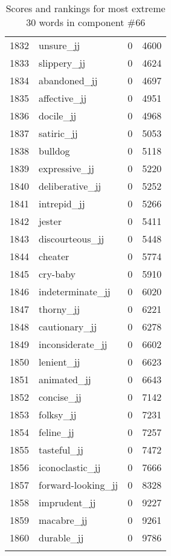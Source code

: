 \begin{longtable}[!htbp]{| rlr@{.}l |}
    1832 & unsure\_jj & 0 & 4600 \\
    1833 & slippery\_jj & 0 & 4624 \\
    1834 & abandoned\_jj & 0 & 4697 \\
    1835 & affective\_jj & 0 & 4951 \\
    1836 & docile\_jj & 0 & 4968 \\
    1837 & satiric\_jj & 0 & 5053 \\
    1838 & bulldog & 0 & 5118 \\
    1839 & expressive\_jj & 0 & 5220 \\
    1840 & deliberative\_jj & 0 & 5252 \\
    1841 & intrepid\_jj & 0 & 5266 \\
    1842 & jester & 0 & 5411 \\
    1843 & discourteous\_jj & 0 & 5448 \\
    1844 & cheater & 0 & 5774 \\
    1845 & cry-baby & 0 & 5910 \\
    1846 & indeterminate\_jj & 0 & 6020 \\
    1847 & thorny\_jj & 0 & 6221 \\
    1848 & cautionary\_jj & 0 & 6278 \\
    1849 & inconsiderate\_jj & 0 & 6602 \\
    1850 & lenient\_jj & 0 & 6623 \\
    1851 & animated\_jj & 0 & 6643 \\
    1852 & concise\_jj & 0 & 7142 \\
    1853 & folksy\_jj & 0 & 7231 \\
    1854 & feline\_jj & 0 & 7257 \\
    1855 & tasteful\_jj & 0 & 7472 \\
    1856 & iconoclastic\_jj & 0 & 7666 \\
    1857 & forward-looking\_jj & 0 & 8328 \\
    1858 & imprudent\_jj & 0 & 9227 \\
    1859 & macabre\_jj & 0 & 9261 \\
    1860 & durable\_jj & 0 & 9786 \\
    \hline
    \caption{Scores and rankings for most extreme 30 words in component \#66} \\
\end{longtable}

